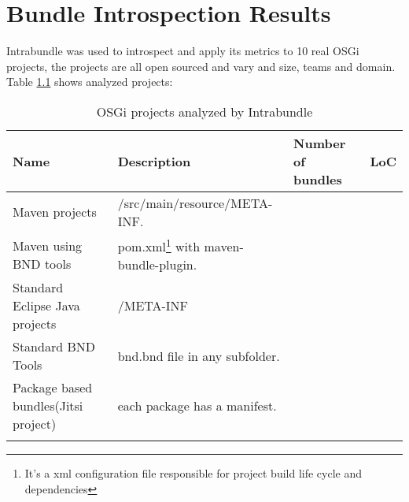 \chapter{Bundle Introspection Results}

Intrabundle was used to introspect and apply its metrics to 10 real OSGi projects, the projects are all open sourced and vary and size, teams and domain. Table \ref{osgi-analyzed-projects} shows analyzed projects:

\begin{table}[h]
\caption{OSGi projects analyzed by Intrabundle}
\label{osgi-analyzed-projects}
\begin{center}
    \begin{tabular}{  p{4cm} | p{6cm} | p{4cm} | p{4cm}}
    \Xhline{2\arrayrulewidth}
    Name & Description & Number of bundles & LoC \\  \hline
    Maven projects & /src/main/resource/META-INF.\\ \hline
    Maven using BND tools & pom.xml\footnote{It's a xml configuration file responsible for project build life cycle and dependencies} with maven-bundle-plugin.\\ \hline
    Standard Eclipse Java projects & /META-INF\\ \hline
    Standard BND Tools & bnd.bnd file in any subfolder.\\ \hline
    Package based bundles(Jitsi project) & each package has a manifest.\\  
   \Xhline{2\arrayrulewidth}

    \end{tabular}
\end{center}
\end{table}
\FloatBarrier 

